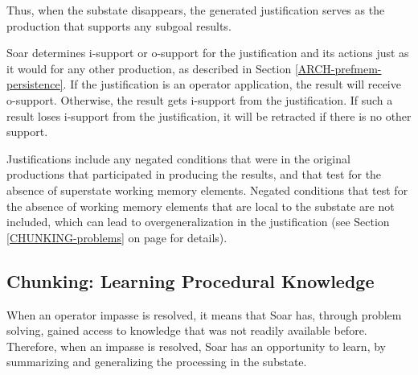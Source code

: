 Thus, when the substate disappears, the generated justification serves as the production that supports any subgoal results.

Soar determines i-support or o-support for the justification and its actions just as it would for any other production, as described in Section \ref{ARCH-prefmem-persistence}.  If the justification is an operator application, the result will receive o-support.  Otherwise, the result gets i-support from the justification. If such a result loses i-support from the justification, it will be retracted if there is no other support.

Justifications include any negated conditions that were in the original productions that participated in producing the results, and that test for the absence of superstate working memory elements. Negated conditions that test for the absence of working memory elements that are local to the substate are not included, which can lead to overgeneralization in the justification (see Section \ref{CHUNKING-problems} on page \pageref{CHUNKING-problems} for details).



\subsection{Chunking: Learning Procedural Knowledge}
\label{ARCH-learning} 

When an operator impasse is resolved, it means that Soar has, through problem solving, gained access to knowledge that was not readily available before. Therefore, when an impasse is resolved, Soar has an opportunity to learn, by summarizing and generalizing the processing in the substate. 

